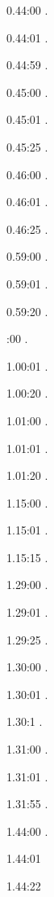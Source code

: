 \label{key}\documentclass[italian]{article}
\begin{document}
0.44:00   .

0.44:01   .

0.44:59   .

0.45:00   .

0.45:01   .

0.45:25   .

0.46:00   .

0.46:01   .

0.46:25   .

0.59:00   .

0.59:01   .

0.59:20   .

:00  .

1.00:01   . 

1.00:20  .

1.01:00   . 

1.01:01  .

1.01:20   . 

1.15:00   . 

1.15:01   . 

1.15:15   . 

1.29:00   . 

1.29:01   . 

1.29:25   . 

1.30:00   .

1.30:01   .

1.30:1   .

1.31:00   .

1.31:01   .

1.31:55   .

1.44:00   .

1.44:01   

1.44:22   
\end{document}
